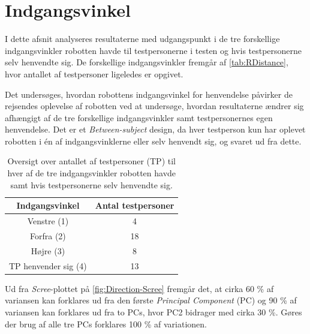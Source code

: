 \section{Indgangsvinkel}
\label{DatabehandlingRIndgangsvinkel}
%
I dette afsnit analyseres resultaterne med udgangspunkt i de tre forskellige indgangsvinkler robotten havde til testpersonerne i testen og hvis testpersonerne selv henvendte sig. De forskellige indgangsvinkler fremgår af \autoref{tab:RDistance}, hvor antallet af testpersoner ligeledes er opgivet. 

Det undersøges, hvordan robottens indgangsvinkel for henvendelse påvirker de rejsendes oplevelse af robotten ved at undersøge, hvordan resultaterne ændrer sig afhængigt af de tre forskellige indgangsvinkler samt testpersonernes egen henvendelse. Det er et \textit{Between-subject} design, da hver testperson kun har oplevet robotten i én af indgangsvinklerne eller selv henvendt sig, og svaret ud fra dette.
%
\begin{table}[H]
\centering
\begin{tabular}{c|c}
Indgangsvinkel & Antal testpersoner \\ \hline
Venstre (1) & 4    \\ \hline
Forfra (2) & 18    \\ \hline
Højre (3) & 8     \\ \hline
TP henvender sig (4) & 13 \\
\end{tabular}
\caption{Oversigt over antallet af testpersoner (TP) til hver af de tre indgangsvinkler robotten havde samt hvis testpersonerne selv henvendte sig.}
\label{tab:RDirection}
\end{table}
\noindent
%
Ud fra \textit{Scree}-plottet på \autoref{fig:Direction-Scree} fremgår det, at cirka 60 \% af variansen kan forklares ud fra den første \textit{Principal Component} (PC) og 90 \% af variansen kan forklares ud fra to PCs, hvor PC2 bidrager med cirka 30 \%. Gøres der brug af alle tre PCs forklares 100 \% af variationen. 
%
